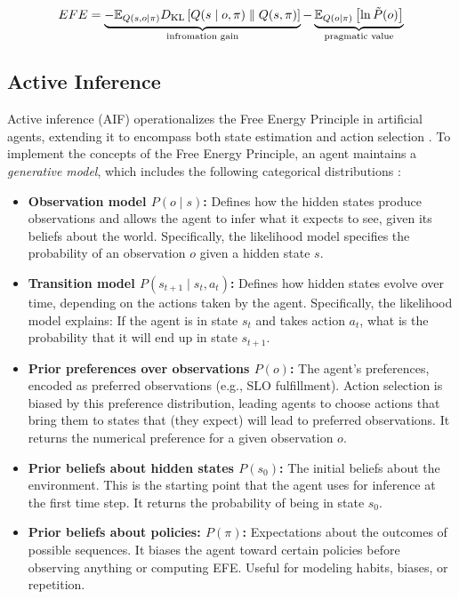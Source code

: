 \begin{equation}
EFE=\underbrace{-\mathbb{E}_{Q(s, o \mid \pi)} D_\mathrm{KL} \left[ Q(s \mid o, \pi) \parallel Q(s, \pi) \right] }_{\text{infromation gain}} - \underbrace{\mathbb{E}_{Q(o \mid \pi)} \left[ \ln \Tilde{P}(o) \right]}_{\text{pragmatic value}}
\end{equation}

\subsection{Active Inference}
Active inference (AIF) operationalizes the Free Energy Principle in artificial agents, extending it to encompass both state estimation and action selection \cite{sedlak_equilibrium_2024, lanillos_active_2021}. To implement the concepts of the Free Energy Principle, an agent maintains a \textit{generative model}, which includes the following categorical distributions \cite{heins_pymdp_2022}:

\begin{itemize}
  \item \textbf{Observation model \(P(o \mid s)\):} Defines how the hidden states produce observations and allows the agent to infer what it expects to see, given its beliefs about the world. Specifically, the likelihood model specifies the probability of an observation \(o\) given a hidden state \(s\). 
  \item \textbf{Transition model \(P(s_{t+1} \mid s_t,a_t)\):} Defines how hidden states evolve over time, depending on the actions taken by the agent. Specifically, the likelihood model explains: If the agent is in state \(s_t\) and takes action \(a_t\), what is the probability that it will end up in state \(s_{t+1}\). 
  \item \textbf{Prior preferences over observations \(P(o)\):} The agent's preferences, encoded as preferred observations (e.g., SLO fulfillment). Action selection is biased by this preference distribution, leading agents to choose actions that bring them to states that (they expect) will lead to preferred observations. It returns the numerical preference for a given observation \(o\).
  \item \textbf{Prior beliefs about hidden states \(P(s_0)\):} The initial beliefs about the environment. This is the starting point that the agent uses for inference at the first time step. It returns the probability of being in state \(s_0\).
  \item \textbf{Prior beliefs about policies: \(P(\pi)\):} Expectations about the outcomes of possible sequences. It biases the agent toward certain policies before observing anything or computing EFE. Useful for modeling habits, biases, or repetition.
\end{itemize}

